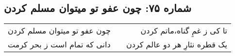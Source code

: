 \begin{center}
\section*{شماره ۷۵: چون عفو تو میتوان مسلم کردن}
\label{sec:075}
\begin{longtable}{l p{0.5cm} r}
چون عفو تو میتوان مسلم کردن
&&
تا کی ز غمِ گناه،‌ماتم کردن
\\
دانی که تمام است ز بحر کرمت
&&
یک قطره نثارِ هر دو عالم کردن
\\
\end{longtable}
\end{center}
